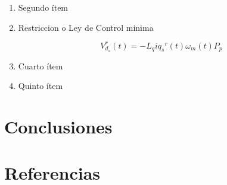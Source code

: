 \documentclass{article}
\begin{document}
\begin{enumerate}[label=\roman*.]
    \item Segundo ítem
    
    
    
    \item Restriccion o Ley de Control minima

    \begin{equation}
        V_{d_{s}}^r(t) = -L_{q}i{q_{s}}^r(t)\omega_{m}(t)P_{p}
    \end{equation}

    \item Cuarto ítem
    


    \item Quinto ítem



\end{enumerate}


\newpage
\part*{Conclusiones}

\newpage
\part*{Referencias}
\lipsum{}
\label{LastPage}    
\end{document}
